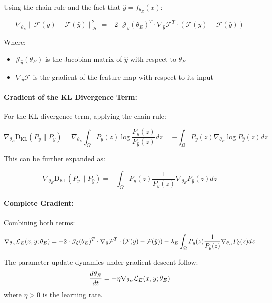 Using the chain rule and the fact that $\hat{y} = f_{\theta_E}(x)$:

\begin{equation}
\nabla_{\theta_E} \|\mathcal{F}(y) - \mathcal{F}(\hat{y})\|_{\mathcal{H}}^2 = -2 \cdot \mathcal{J}_{\hat{y}}(\theta_E)^T \cdot \nabla_{\hat{y}} \mathcal{F}^T \cdot (\mathcal{F}(y) - \mathcal{F}(\hat{y}))
\end{equation}

Where:
\begin{itemize}
\item $\mathcal{J}_{\hat{y}}(\theta_E)$ is the Jacobian matrix of $\hat{y}$ with respect to $\theta_E$
\item $\nabla_{\hat{y}} \mathcal{F}$ is the gradient of the feature map with respect to its input
\end{itemize}

\paragraph{Gradient of the KL Divergence Term:}
For the KL divergence term, applying the chain rule:

\begin{equation}
\nabla_{\theta_E} \mathrm{D_{KL}}(P_y \| P_{\hat{y}}) = \nabla_{\theta_E} \int_{\Omega} P_y(z) \log\frac{P_y(z)}{P_{\hat{y}}(z)} dz = -\int_{\Omega} P_y(z) \nabla_{\theta_E} \log P_{\hat{y}}(z) dz
\end{equation}

This can be further expanded as:

\begin{equation}
\nabla_{\theta_E} \mathrm{D_{KL}}(P_y \| P_{\hat{y}}) = -\int_{\Omega} P_y(z) \frac{1}{P_{\hat{y}}(z)} \nabla_{\theta_E} P_{\hat{y}}(z) dz
\end{equation}

\paragraph{Complete Gradient:}
Combining both terms:

\begin{equation}
\nabla_{\theta_E} \mathcal{L}_E(x, y; \theta_E) = -2 \cdot \mathcal{J}_{\hat{y}}(\theta_E)^T \cdot \nabla_{\hat{y}} \mathcal{F}^T \cdot (\mathcal{F}(y) - \mathcal{F}(\hat{y})) - \lambda_E \int_{\Omega} P_y(z) \frac{1}{P_{\hat{y}}(z)} \nabla_{\theta_E} P_{\hat{y}}(z) dz
\end{equation}

\begin{proposition}
The parameter update dynamics under gradient descent follow:
\begin{equation}
\frac{d\theta_E}{dt} = -\eta \nabla_{\theta_E} \mathcal{L}_E(x, y; \theta_E)
\end{equation}
where $\eta > 0$ is the learning rate.
\end{proposition}


